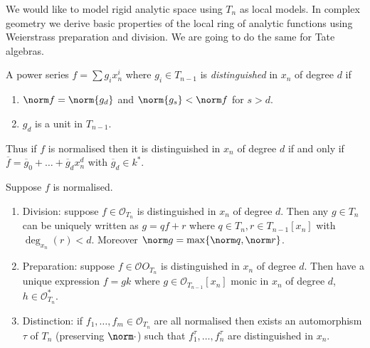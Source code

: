 \documentclass[a4paper]{article}
\renewcommand*{\O}{\mathcal{O}}
\begin{document}
We would like to model rigid analytic space using \(T_n\) as local models. In complex geometry we derive basic properties of the local ring of analytic functions using Weierstrass preparation and division. We are going to do the same for Tate algebras.

\begin{definition}
  A power series \(f = \sum g_i x_n^i\) where \(g_i \in T_{n - 1}\) is \emph{distinguished} in \(x_n\) of degree \(d\) if
  \begin{enumerate}
  \item \(\norm f = \norm{g_d}\) and \(\norm{g_s} < \norm f\) for \(s > d\).
  \item \(g_d\) is a unit in \(T_{n - 1}\).
  \end{enumerate}
\end{definition}
Thus if \(f\) is normalised then it is distinguished in \(x_n\) of degree \(d\) if and only if \(\overline f = \overline g_0 + \dots + \overline g_d x_n^d\) with \(\overline g_d \in k^*\).

\begin{theorem}
  Suppose \(f\) is normalised.
  \begin{enumerate}
  \item Division: suppose \(f \in \O_{T_n}\) is distinguished in \(x_n\) of degree \(d\). Then any \(g \in T_n\) can be uniquely written as \(g = qf + r\) where \(q \in T_n, r \in T_{n - 1}[x_n]\) with \(\deg_{x_n}(r) < d\). Moreover \(\norm g = \max\{\norm q, \norm r\}\).
  \item Preparation: suppose \(f \in \O O_{T_n}\) is distinguished in \(x_n\) of degree \(d\). Then have a unique expression \(f = gk\) where \(g \in \O_{T_{n - 1}}[x_n]\) monic in \(x_n\) of degree \(d\), \(h \in \O_{T_n}^*\).
  \item Distinction: if \(f_1, \dots, f_m \in \O_{T_n}\) are all normalised then exists an automorphism \(\tau\) of \(T_n\) (preserving \(\norm \cdot\)) such that \(f_1^\tau, \dots, f_n^\tau\) are distinguished in \(x_n\).
  \end{enumerate}
\end{theorem}
\end{document}
